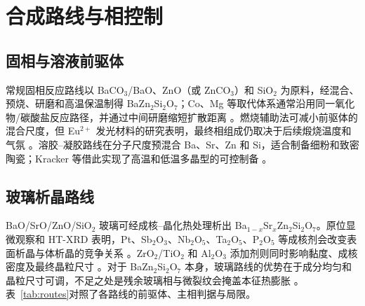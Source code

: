 \section{合成路线与相控制}

\subsection{固相与溶液前驱体}

常规固相反应路线以 BaCO$_3$\slash BaO、ZnO（或 ZnCO$_3$）和 SiO$_2$ 为原料，经混合、预烧、研磨和高温保温制得 BaZn$_2$Si$_2$O$_7$；Co、Mg 等取代体系通常沿用同一氧化物/碳酸盐反应路径，并通过中间研磨缩短扩散距离 \cite{kerstan2013bazn2si2o7,thieme2016new}。燃烧辅助法可减小前驱体的混合尺度，但 Eu$^{2+}$ 发光材料的研究表明，最终相组成仍取决于后续煅烧温度和气氛 \cite{yao2010synthesis,yao2010synthesisx}。溶胶--凝胶路线在分子尺度预混合 Ba、Sr、Zn 和 Si，适合制备细粉和致密陶瓷；Kracker 等借此实现了高温和低温多晶型的可控制备 \cite{kracker2016sol}。

\subsection{玻璃析晶路线}

BaO\slash SrO\slash ZnO\slash SiO$_2$ 玻璃可经成核--晶化热处理析出 Ba$_{1-x}$Sr$_x$Zn$_2$Si$_2$O$_7$。原位显微观察和 HT\nobreakdash-XRD 表明，Pt、Sb$_2$O$_3$、Nb$_2$O$_5$、Ta$_2$O$_5$、P$_2$O$_5$ 等成核剂会改变表面析晶与体析晶的竞争关系 \cite{bocker2012in,vladislavova2017heterogeneous,vladislavova2019crystallization,heitmann2019surface,thieme2017on,vladislavova2018nucleation}。ZrO$_2$\slash TiO$_2$ 和 Al$_2$O$_3$ 添加剂则同时影响黏度、成核密度及最终晶粒尺寸 \cite{vladislavova2018crystallisation,thieme2017effect}。对于 BaZn$_2$Si$_2$O$_7$ 本身，玻璃路线的优势在于成分均匀和晶粒尺寸可调，不足之处是残余玻璃相与微裂纹会掩盖本征热膨胀 \cite{thieme2016thermal,thieme2015high}。表~\ref{tab:routes}\CJKecglue{}对照了各路线的前驱体、主相判据与局限。


